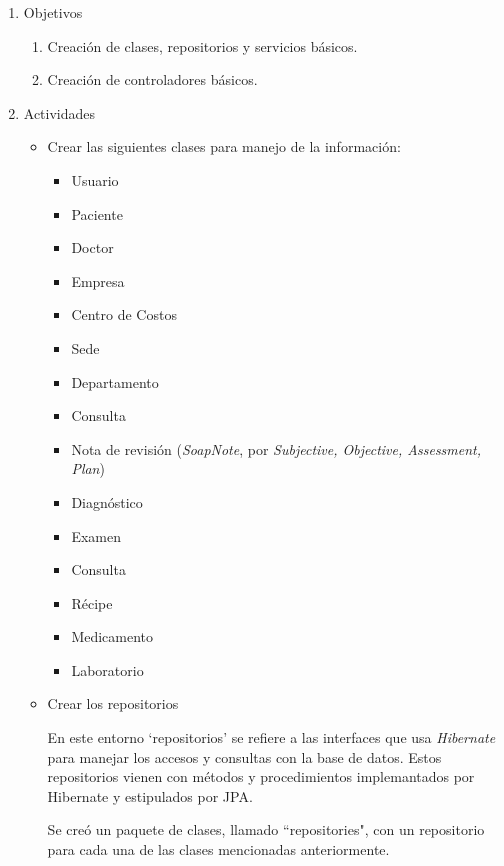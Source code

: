     \begin{enumerate}
        \item Objetivos
        \begin{enumerate}
            \item Creación de clases, repositorios y servicios básicos.
            \item Creación de controladores básicos.
        \end{enumerate}
        \item Actividades
        \begin{itemize}
            \item Crear las siguientes clases para manejo de la información:
            \begin{itemize}
                \item Usuario
                \item Paciente
                \item Doctor
                \item Empresa
                \item Centro de Costos
                \item Sede
                \item Departamento
                \item Consulta
                \item Nota de revisión (\textit{SoapNote}, por \textit{Subjective, Objective, Assessment, Plan})
                \item Diagnóstico
                \item Examen
                \item Consulta
                \item Récipe
                \item Medicamento
                \item Laboratorio
            \end{itemize}
            
            \item Crear los repositorios
            
            En este entorno `repositorios' se refiere a las interfaces que usa \textit{Hibernate} para manejar los accesos y consultas con la base de datos. Estos repositorios vienen con métodos y procedimientos  implemantados por Hibernate y estipulados por JPA.
            
            Se creó un paquete de clases, llamado ``repositories", con un repositorio para cada una de las clases mencionadas anteriormente.
             

\end{itemize}
\end{enumerate}
